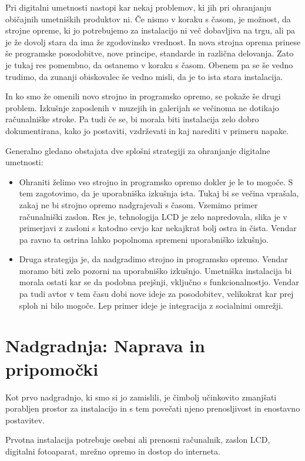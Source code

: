 Pri digitalni umetnosti nastopi kar nekaj problemov, ki jih pri ohranjanju
običajnih umetniških produktov ni. Če nismo v koraku s časom, je možnost, da
strojne opreme, ki jo potrebujemo za instalacijo ni več dobavljiva na trgu,
ali pa je že dovolj stara da ima že zgodovinsko vrednost. In nova strojna
oprema prinese še programske posodobitve, nove principe, standarde in različna
delovanja. Zato je tukaj res pomembno, da ostanemo v koraku s časom. Obenem pa
se še vedno trudimo, da zunanji obiskovalec še vedno misli, da je to ista
stara instalacija.

In ko smo že omenili novo strojno in programsko opremo, se pokaže še drugi
problem. Izkušnje zaposlenih v muzejih in galerijah se večinoma ne dotikajo
računalniške stroke. Pa tudi če se, bi morala biti instalacija zelo dobro
dokumentirana, kako jo postaviti, vzdrževati in kaj narediti v primeru napake.

Generalno gledano obstajata dve splošni strategiji za ohranjanje digitalne
umetnosti:
\begin{itemize}
\item
Ohraniti želimo vso strojno in programsko opremo dokler je le to mogoče. S tem
zagotovimo, da je uporabniška izkušnja ista. Tukaj bi se večina vprašala,
zakaj ne bi strojno opremo nadgrajevali s časom. Vzemimo primer računalniški
zaslon. Res je, tehnologija LCD je zelo napredovala, slika je v primerjavi z
zasloni s katodno cevjo kar nekajkrat bolj ostra in čista. Vendar pa ravno ta
ostrina lahko popolnoma spremeni uporabniško izkušnjo.

\item
Druga strategija je, da nadgradimo strojno in programsko opremo. Vendar moramo
biti zelo pozorni na uporabniško izkušnjo. Umetniška instalacija bi morala
ostati kar se da podobna prejšnji, vključno s funkcionalnostjo. Vendar pa tudi
avtor v tem času dobi nove ideje za posodobitev, velikokrat kar prej sploh ni
bilo mogoče. Lep primer ideje je integracija z socialnimi omrežji.
\end{itemize}


\chapter{Nadgradnja: Naprava in pripomočki}
Kot prvo nadgradnjo, ki smo si jo zamislili, je čimbolj učinkovito zmanjšati
porabljen prostor za instalacijo in s tem povečati njeno prenosljivost in
enostavno postavitev.

Prvotna instalacija potrebuje osebni ali prenosni računalnik, zaslon LCD,
digitalni fotoaparat, mrežno opremo in dostop do interneta.

